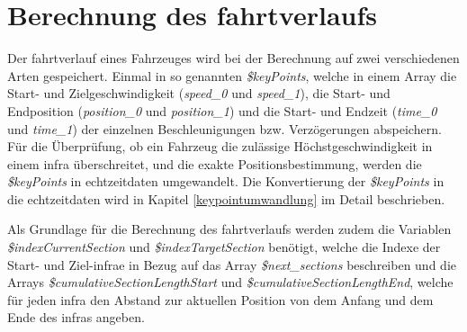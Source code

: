 \section{Berechnung des \Gls{fahrtverlauf}s} \label{kapitelFahrtverlauf}
Der \Gls{fahrtverlauf} eines Fahrzeuges wird bei der Berechnung auf zwei verschiedenen Arten gespeichert. Einmal in so genannten \textit{\$keyPoints}, welche in einem Array die Start- und Zielgeschwindigkeit (\textit{speed\_0} und \textit{speed\_1}), die Start- und Endposition (\textit{position\_0} und \textit{position\_1}) und die Start- und Endzeit (\textit{time\_0} und \textit{time\_1}) der einzelnen Beschleunigungen bzw. Verzögerungen abspeichern. Für die Überprüfung, ob ein Fahrzeug die zulässige Höchstgeschwindigkeit in einem \ac{infra} überschreitet, und die exakte Positionsbestimmung, werden die \textit{\$keyPoints} in \Gls{echtzeitdaten} umgewandelt. Die Konvertierung der \textit{\$keyPoints} in die \Gls{echtzeitdaten} wird in Kapitel \ref{keypointumwandlung} im Detail beschrieben.

Als Grundlage für die Berechnung des \Gls{fahrtverlauf}s werden zudem die Variablen \textit{\$indexCurrentSection} und \textit{\$indexTargetSection} benötigt, welche die Indexe der Start- und Ziel-\ac{infra}e in Bezug auf das Array \textit{\$next\_sections} beschreiben und die Arrays \textit{\$cumulativeSectionLengthStart} und \textit{\$cumulativeSectionLengthEnd}, welche für jeden \ac{infra} den Abstand zur aktuellen Position von dem Anfang und dem Ende des \ac{infra}s angeben.

